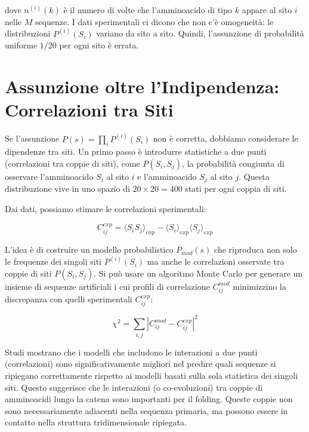 dove $n^{(i)}(k)$ è il numero di volte che l'amminoacido di tipo $k$ appare al sito $i$ nelle $M$ sequenze.
I dati sperimentali ci dicono che non c'è omogeneità: le distribuzioni $P^{(i)}(S_i)$ variano da sito a sito. Quindi, l'assunzione di probabilità uniforme $1/20$ per ogni sito è errata.


\section{Assunzione oltre l'Indipendenza: Correlazioni tra Siti}
Se l'assunzione $P(s) = \prod_i P^{(i)}(S_i)$ non è corretta, dobbiamo considerare le dipendenze tra siti. Un primo passo è introdurre statistiche a due punti (correlazioni tra coppie di siti), come $P(S_i, S_j)$, la probabilità congiunta di osservare l'amminoacido $S_i$ al sito $i$ e l'amminoacido $S_j$ al sito $j$. Questa distribuzione vive in uno spazio di $20 \times 20 = 400$ stati per ogni coppia di siti.



Dai dati, possiamo stimare le correlazioni sperimentali:

\begin{equation} \label{eq:ch24_8}
C_{ij}^{exp} = \langle S_i S_j \rangle_{exp} - \langle S_i \rangle_{exp} \langle S_j \rangle_{exp} 
\end{equation}

L'idea è di costruire un modello probabilistico $P_{mod}(s)$ che riproduca non solo le frequenze dei singoli siti $P^{(i)}(S_i)$ ma anche le correlazioni osservate tra coppie di siti $P(S_i,S_j)$.
Si può usare un algoritmo Monte Carlo per generare un insieme di sequenze artificiali i cui profili di correlazione $C_{ij}^{mod}$ minimizzino la discrepanza con quelli sperimentali $C_{ij}^{exp}$:

\begin{equation} \label{eq:ch24_9}
\chi^2 = \sum_{i,j} |C_{ij}^{mod} - C_{ij}^{exp}|^2
\end{equation}

Studi mostrano che i modelli che includono le interazioni a due punti (correlazioni) sono significativamente migliori nel predire quali sequenze si ripiegano correttamente rispetto ai modelli basati sulla sola statistica dei singoli siti. Questo suggerisce che le interazioni (o co-evoluzioni) tra coppie di amminoacidi lungo la catena sono importanti per il folding. Queste coppie non sono necessariamente adiacenti nella sequenza primaria, ma possono essere in contatto nella struttura tridimensionale ripiegata.



